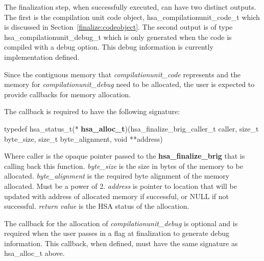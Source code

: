 \documentclass{book}
\newcommand{\hsadef}[2]{\hypertarget{#1}{\textbf{#2}}}
\newcommand{\reffun}[1]{\textbf{#1}}
\newcommand{\reftyp}[1]{#1}
\begin{document}
\begin{appendices}
The finalization step, when successfully executed, can have two
distinct outputs. The first is the compilation unit code object,
\reftyp{hsa\_compilationunit\_code\_t} which is discussed in
Section~\ref{finalize:codeobject}. The second output is of type
\reftyp{hsa\_compilationunit\_debug\_t} which is only generated when
the code is  compiled with a debug option. This debug information is
currently implementation defined.

Since the contiguous memory that {\itshape
compilationunit\_code} represents and the memory for {\itshape
compilationunit\_debug} need to be allocated, the user is expected
to provide callbacks for memory allocation.

The callback is required to have the following signature:
\makeatletter{}

\noindent\begin{tcolorbox}[nobeforeafter,arc=0mm,colframe=white,colback=lightgray,left=0mm]
typedef hsa\_status\_t(*  \hsadef{group__TDF__hsa__alloc__t_1ga96fcd66293afa5cd699747298a4010b6}{hsa\_alloc\_t})(hsa\_finalize\_brig\_caller\_t caller, size\_t byte\_size, size\_t byte\_alignment, void **address)
\end{tcolorbox}
 

Where caller is the opaque pointer passed to the
\reffun{hsa\_finalize\_brig} that is calling back this function.
{\itshape byte\_size} is the size in bytes of the memory to be
allocated.  {\itshape byte\_alignment} is the required byte alignment
of the memory allocated. Must be a power of 2.  {\itshape address} is
pointer to location that will be updated with address of allocated
memory if successful, or NULL if not successful.  {\itshape return
  value} is the HSA status of the allocation.

The callback for the allocation of {\itshape compilationunit\_debug}
is optional and is required when the user passes in a flag at
finalization to generate debug information. This callback, when
defined, must have the same signature as \reftyp{hsa\_alloc\_t} above.

\makeatletter{}


\end{appendices}
\end{document}
